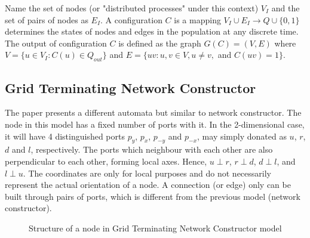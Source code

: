 \par\noindent
Name the set of nodes (or "distributed processes" under this context) $V_{I}$ and the set of pairs of nodes as $E_{I}$.
A configuration $C$ is a mapping $ V_{I} \cup E_{I} \to Q \cup \{0,1\} $ determines the states of nodes and edges in the population at any discrete time.
The output of configuration $C$ is defined as the graph $G(C) = (V, E) $ where $V = \{u \in V_{I}: C(u) \in Q_{out}\}$
and  $E = \{uv: u, v \in V, u \not= v,$ and $C(uv) = 1\}$.

\subsection{Grid Terminating Network Constructor \cite{Mi17} \label{IntroToGrid}}
\par\noindent
The paper \cite{Mi17} presents a different automata but similar to network constructor. The node in this
model has a fixed number of ports with it. In the 2-dimensional case, it will have 4 distinguished ports
$p_{y}$, $p_{x}$, $p_{-y}$ and $p_{-x}$, may simply donated as $u$, $r$, $d$ and $l$, respectively.
The ports which neighbour with each other are also perpendicular to each other, forming local axes. Hence,
$ u \perp r $, $ r \perp d $, $ d \perp l $, and  $ l \perp u $. The coordinates are only for local purposes and
do not necessarily represent the actual orientation of a node. A connection (or edge) only can be built through
pairs of ports, which is different from the previous model (network constructor).

\par\noindent
\begin{figure}[H]
\begin{center}
\end{center}
\caption{Structure of a node in Grid Terminating Network Constructor model}
\end{figure}

\par\noindent
